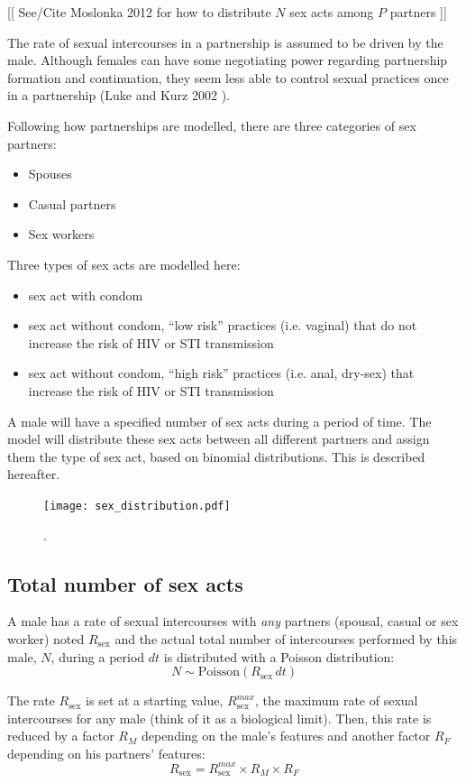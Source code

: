 \documentclass[11pt, onecolumn]{article}
\begin{document}
[[ See/Cite Moslonka 2012 for how to distribute $N$ sex acts among $P$ partners ]]

The rate of sexual intercourses in a partnership is assumed to be driven by the male. Although females can have some negotiating power regarding partnership formation and continuation, they seem less able to control sexual practices once in a partnership (Luke and Kurz 2002 \cite{x}).  

Following how partnerships are modelled, there are three categories of sex partners:
\begin{itemize}
\item Spouses
\item Casual partners
\item Sex workers
\end{itemize}

Three types of sex acts are modelled here:
\begin{itemize}
\item sex act with condom
\item sex act without condom, ``low risk'' practices  (i.e. vaginal) that do not increase the risk of HIV or STI transmission
\item sex act without condom, ``high risk'' practices  (i.e. anal, dry-sex) that increase the risk of HIV or STI transmission
\end{itemize}

A male will have a specified number of sex acts during a period of time. The model will distribute these sex acts between all different partners and assign them the type of sex act, based on binomial distributions. This is described hereafter.

\begin{figure}[ht]
\centering
    \texttt{[image: sex\_distribution.pdf]}
\caption{.}
\label{fig:sexDistribution}
\end{figure}


\subsection{Total number of sex acts}

A male has a rate of sexual intercourses with \emph{any} partners (spousal, casual or sex worker) noted $R_{\mathrm{sex}}$ and the actual total number of intercourses performed by this male, $N$, during a period $dt$ is distributed with a Poisson distribution: 
$$N\sim \mathrm{Poisson}(R_{\mathrm{sex}}\, dt)$$

The rate $R_{\mathrm{sex}}$ is set at a starting value,  $R_{\mathrm{sex}}^{max}$, the maximum rate of sexual intercourses for any male (think of it as a biological limit). Then, this rate is reduced by a factor $R_M$ depending on the male's features  and another factor $R_F$ depending on his partners' features:
$$R_{\mathrm{sex}} = R_{\mathrm{sex}}^{max} \times R_{M} \times R_{F} $$
\end{document}
